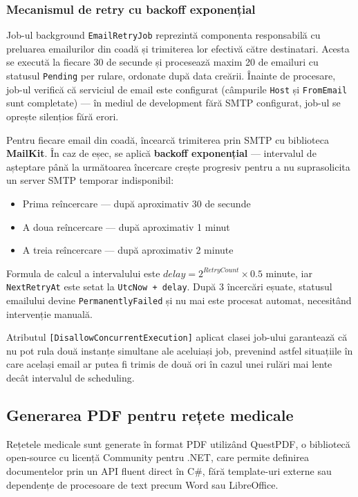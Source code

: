 \documentclass[12pt, a4paper]{report}
\begin{document}
\subsubsection{Mecanismul de retry cu backoff exponențial}

Job-ul background \texttt{EmailRetryJob} reprezintă componenta responsabilă cu
preluarea emailurilor din coadă și trimiterea lor efectivă către destinatari. Acesta
se execută la fiecare 30 de secunde și procesează maxim 20 de emailuri cu statusul
\texttt{Pending} per rulare, ordonate după data creării. Înainte de procesare,
job-ul verifică că serviciul de email este configurat (câmpurile \texttt{Host} și
\texttt{FromEmail} sunt completate) --- în mediul de development fără SMTP
configurat, job-ul se oprește silențios fără erori.

Pentru fiecare email din coadă, încearcă trimiterea prin SMTP cu biblioteca
\textbf{MailKit}. În caz de eșec, se aplică \textbf{backoff exponențial} ---
intervalul de așteptare până la următoarea încercare crește progresiv pentru
a nu suprasolicita un server SMTP temporar indisponibil:

\begin{itemize}
    \item Prima reîncercare --- după aproximativ 30 de secunde
    \item A doua reîncercare --- după aproximativ 1 minut
    \item A treia reîncercare --- după aproximativ 2 minute
\end{itemize}

Formula de calcul a intervalului este $delay = 2^{RetryCount} \times 0.5$ minute,
iar \texttt{NextRetryAt} este setat la \texttt{UtcNow + delay}. După 3 încercări
eșuate, statusul emailului devine \texttt{PermanentlyFailed} și nu mai este procesat
automat, necesitând intervenție manuală.

Atributul \texttt{[DisallowConcurrentExecution]} aplicat clasei job-ului garantează
că nu pot rula două instanțe simultane ale aceluiași job, prevenind astfel situațiile
în care același email ar putea fi trimis de două ori în cazul unei rulări mai lente
decât intervalul de scheduling.


\subsection{Generarea PDF pentru rețete medicale}

Rețetele medicale sunt generate în format PDF utilizând QuestPDF, o
bibliotecă open-source cu licență Community pentru .NET, care permite definirea
documentelor prin un API fluent direct în C\#, fără template-uri externe sau
dependențe de procesoare de text precum Word sau LibreOffice.
\end{document}
